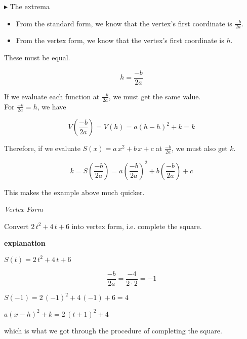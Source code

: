 \documentclass{ximera}
\begin{document}
\textbf{\textcolor{blue!55!black}{$\blacktriangleright$}}  The extrema \\



\begin{itemize}
\item From the standard form, we know that the vertex's first coordinate is $\frac{-b}{2 a}$.
\item From the vertex form, we know that the vertex's first coordinate is $h$.
\end{itemize}


These must be equal.

\[
h = \frac{-b}{2 a}
\]



If we evaluate each function at $\frac{-b}{2 a}$, we must get the same value.  \\

For $\frac{-b}{2 a}  = h$, we have 

\[
V\left( \frac{-b}{2 a} \right) = V(h) = a (h - h)^2 + k = k
\]

Therefore, if we evaluate $S(x) = a \, x^2 + b \, x + c$ at $\frac{-b}{2 a}$, we must also get $k$.



\[
k = S\left( \frac{-b}{2 a} \right) = a \left( \frac{-b}{2 a} \right)^2 + b \left( \frac{-b}{2 a} \right) + c 
\]







This makes the example above much quicker.





\begin{example} \textit{Vertex Form}



Convert $2 \, t^2 + 4 \, t + 6$ into vertex form, i.e. complete the square.


\textbf{\textcolor{red!75!green}{explanation}} 


$S(t) = 2 \, t^2 + 4 \, t + 6$


\[
\frac{-b}{2 a} = \frac{-4}{2 \cdot 2} = -1
\]


$S(-1) = 2 \, (-1)^2 + 4 \, (-1) + 6 = 4$



$a (x - h)^2 + k = 2 \, (t+1)^2 + 4$

which is what we got through the procedure of completing the square.





\end{example}
\end{document}

